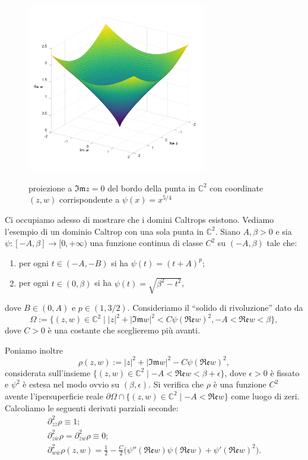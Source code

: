 \begin{figure}[h!]
    \begin{center}
        \includegraphics[width=0.7\textwidth, trim=0 4cm 0 2.5cm]{Immagini/caltrop.png} \\
        \caption{proiezione a $\mathfrak{Im}z=0$ del bordo della punta in $\mathbb{C}^2$ con coordinate $(z,w)$ corrispondente a $\psi(x)=x^{5/4}$}
    \end{center}
\end{figure}

Ci occupiamo adesso di mostrare che i domini Caltrops esistono. Vediamo l'esempio di un dominio Caltrop con una sola punta in $\mathbb{C}^2$. Siano $A,\beta>0$ e sia $\psi:[-A,\beta]\longrightarrow[0,+\infty)$ una funzione continua di classe $C^2$ su $(-A,\beta)$ tale che:
\begin{enumerate}[label={(\arabic*)}]
    \item per ogni $t\in(-A,-B)$ si ha $\psi(t)=(t+A)^p$;
    \item per ogni $t\in(0,\beta)$ si ha $\psi(t)=\sqrt{\beta^2-t^2}$,
\end{enumerate}
dove $B\in(0,A)$ e $p\in(1,3/2)$. Consideriamo il ``solido di rivoluzione'' dato da
$$\Omega:=\{(z,w)\in\mathbb{C}^2\mid |z|^2+|\mathfrak{Im}w|^2<C\psi(\mathfrak{Re}w)^2,-A<\mathfrak{Re}w<\beta\},$$
dove $C>0$ è una costante che sceglieremo più avanti.

Poniamo inoltre
$$\rho(z,w):=|z|^2+|\mathfrak{Im}w|^2-C\psi(\mathfrak{Re}w)^2,$$
considerata sull'insieme $\{(z,w)\in\mathbb{C}^2\mid -A<\mathfrak{Re}w<\beta+\epsilon\}$, dove $\epsilon>0$ è fissato e $\psi^2$ è estesa nel modo ovvio su $(\beta,\epsilon)$. Si verifica che $\rho$ è una funzione $C^2$ avente l'ipersuperficie reale $\partial\Omega\cap\{(z,w)\in\mathbb{C}^2\mid -A<\mathfrak{Re}w\}$ come luogo di zeri. Calcoliamo le seguenti derivati parziali seconde:
\begin{gather*}
    \partial^2_{z\bar{z}}\rho\equiv 1;\\
    \partial^2_{z\bar{w}}\rho=\partial^2_{\bar{z}w}\rho\equiv 0;\\
    \partial^2_{w\bar{w}}\rho(z,w)=\frac{1}{2}-\frac{C}{2}\big(\psi''(\mathfrak{Re}w)\psi(\mathfrak{Re}w)+\psi'(\mathfrak{Re}w)^2\big).
\end{gather*}

